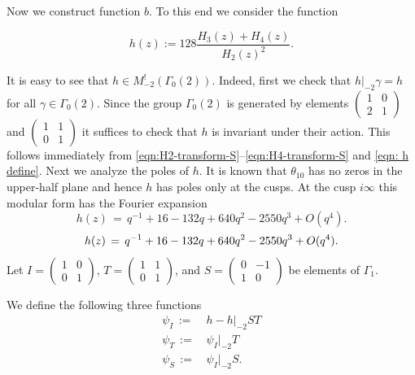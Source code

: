 Now we construct function $b$. To this end we consider the function
\begin{definition}\label{def: h}
\begin{equation}\label{eqn: h define}
    h(z) := 128 \frac{H_3(z) + H_4(z)}{H_2(z)^2}.
\end{equation}
\end{definition}
It is easy to see that $h\in M^!_{-2}(\Gamma_0(2))$. Indeed, first we check that $h|_{-2}\gamma=h$
for all $\gamma\in\Gamma_0(2)$. Since the group $\Gamma_0(2)$ is generated by elements
$\left(\begin{smallmatrix}1&0\\2&1\end{smallmatrix}\right)$ and $\left(\begin{smallmatrix}1&1\\0&1\end{smallmatrix}\right)$
it suffices to check that $h$ is invariant under their action. This follows immediately
from \eqref{eqn:H2-transform-S}--\eqref{eqn:H4-transform-S} and \eqref{eqn: h define}. Next we analyze the poles of $h$.
It is known \cite[Chapter~I Lemma~4.1]{Mumford} that $\theta_{10}$ has no zeros in the upper-half plane and hence $h$ has poles only at the cusps.
At the cusp $i\infty$ this modular form has the Fourier expansion
\ifplastex
\begin{equation*}
h(z)\,=\,q^{-1} + 16 - 132 q + 640 q^2 - 2550 q^3+O(q^4).
\end{equation*}
\else
\begin{equation}
h(z)\,=\,q^{-1} + 16 - 132 q + 640 q^2 - 2550 q^3+O(q^4).\notag
\end{equation}
\fi
Let $I=\left(\begin{smallmatrix}1&0\\0&1\end{smallmatrix}\right)$,
$T=\left(\begin{smallmatrix}1&1\\0&1\end{smallmatrix}\right)$, and
$S=\left(\begin{smallmatrix}0&-1\\1&0\end{smallmatrix}\right)$ be elements of $\Gamma_1$.
\begin{definition}\label{def:psiI-psiT-psiS}
We define the following three functions
\begin{align}
    \psi_I\,:=\,&h-h|_{-2}ST \label{eqn:psiI-define}\\
    \psi_T\,:=\,&\psi_I|_{-2}T \label{eqn:psiT-define}\\
    \psi_S\,:=\,&\psi_I|_{-2}S. \label{eqn:psiS-define}
\end{align}
\end{definition}

